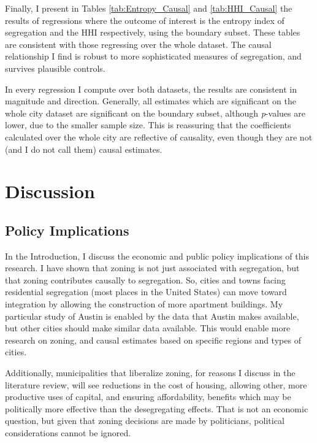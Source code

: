 \documentclass[11pt]{article}
\begin{document}
Finally, I present in Tables \ref{tab:Entropy_Causal} and \ref{tab:HHI_Causal} the results of regressions where the outcome of interest is the entropy index of segregation and the HHI respectively, using the boundary subset. These tables are consistent with those regressing over the whole dataset. The causal relationship I find is robust to more sophisticated measures of segregation, and survives plausible controls.

In every regression I compute over both datasets, the results are consistent in magnitude and direction. Generally, all estimates which are significant on the whole city dataset are significant on the boundary subset, although \textit{p}-values are lower, due to the smaller sample size. This is reassuring that the coefficients calculated over the whole city are reflective of causality, even though they are not (and I do not call them) causal estimates.

\section{Discussion}

\subsection{Policy Implications}

In the Introduction, I discuss the economic and public policy implications of this research. I have shown that zoning is not just associated with segregation, but that zoning contributes causally to segregation. So, cities and towns facing residential segregation (most places in the United States) can move toward integration by allowing the construction of more apartment buildings. My particular study of Austin is enabled by the data that Austin makes available, but other cities should make similar data available. This would enable more research on zoning, and causal estimates based on specific regions and types of cities.

Additionally, municipalities that liberalize zoning, for reasons I discuss in the literature review, will see reductions in the cost of housing, allowing other, more productive uses of capital, and ensuring affordability, benefits which may be politically more effective than the desegregating effects. That is not an economic question, but given that zoning decisions are made by politicians, political considerations cannot be ignored.
\end{document}
